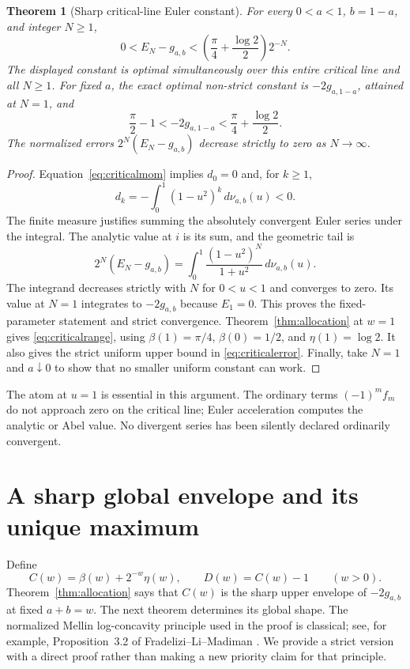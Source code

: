 \documentclass[11pt,a4paper]{article}
\numberwithin{equation}{section}
\newtheorem{theorem}{Theorem}[section]
\theoremstyle{definition}
\theoremstyle{remark}
\begin{document}
\begin{theorem}[Sharp critical-line Euler constant]\label{thm:criticalconstant}
For every $0<a<1$, $b=1-a$, and integer $N\ge1$,
\begin{equation}\label{eq:criticalerror}
 0<E_N-g_{a,b}<
 \left(\frac\pi4+\frac{\log2}{2}\right)2^{-N}.
\end{equation}
The displayed constant is optimal simultaneously over this entire
critical line and all $N\ge1$. For fixed $a$, the exact optimal
non-strict constant is $-2g_{a,1-a}$, attained at $N=1$, and
\begin{equation}\label{eq:criticalrange}
 \frac\pi2-1<-2g_{a,1-a}<\frac\pi4+\frac{\log2}{2}.
\end{equation}
The normalized errors $2^N(E_N-g_{a,b})$ decrease strictly to zero as
$N\to\infty$.
\end{theorem}
\begin{proof}
Equation~\eqref{eq:criticalmom} implies $d_0=0$ and, for $k\ge1$,
\[
 d_k=-\int_0^1(1-u^2)^k\,d\nu_{a,b}(u)<0.
\]
The finite measure justifies summing the absolutely convergent Euler
series under the integral. The analytic value at $i$ is its sum, and
the geometric tail is
\begin{equation}\label{eq:atomicerror}
 2^N(E_N-g_{a,b})=
 \int_0^1\frac{(1-u^2)^N}{1+u^2}\,d\nu_{a,b}(u).
\end{equation}
The integrand decreases strictly with $N$ for $0<u<1$ and converges
to zero. Its value at $N=1$ integrates to $-2g_{a,b}$ because $E_1=0$.
This proves the fixed-parameter statement and strict convergence.
Theorem~\ref{thm:allocation} at $w=1$ gives \eqref{eq:criticalrange},
using $\beta(1)=\pi/4$, $\beta(0)=1/2$, and $\eta(1)=\log2$.
It also gives the strict uniform upper bound in \eqref{eq:criticalerror}.
Finally, take $N=1$ and $a\downarrow0$ to show that no smaller uniform
constant can work.
\end{proof}

The atom at $u=1$ is essential in this argument. The ordinary terms
$(-1)^m f_m$ do not approach zero on the critical line; Euler acceleration
computes the analytic or Abel value. No divergent series has been
silently declared ordinarily convergent.

\section{A sharp global envelope and its unique maximum}
\label{sec:envelope}

Define
\begin{equation}\label{eq:Cdef}
 C(w)=\beta(w)+2^{-w}\eta(w),\qquad D(w)=C(w)-1\qquad(w>0).
\end{equation}
Theorem~\ref{thm:allocation} says that $C(w)$ is the sharp upper
envelope of $-2g_{a,b}$ at fixed $a+b=w$. The next theorem determines
its global shape. The normalized Mellin log-concavity principle used
in the proof is classical; see, for example, Proposition~3.2 of
Fradelizi--Li--Madiman \cite{flm}. We provide a strict version with
a direct proof rather than making a new priority claim for that principle.
\end{document}
